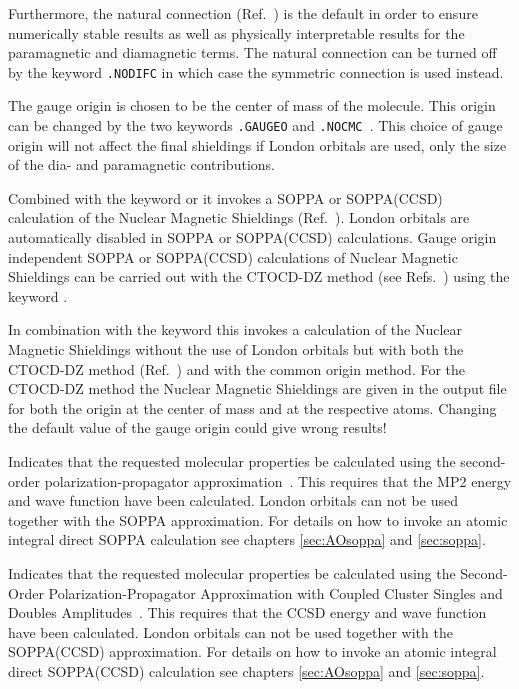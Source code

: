 \begin{description}
Furthermore, the natural connection
(Ref.~\cite{joklbkrthpjtca90,krthjopjklbcpl235}) is the default in order to ensure
numerically stable results as well as physically interpretable
results for the paramagnetic and diamagnetic terms. The natural
connection can be turned off by the keyword \verb|.NODIFC| in which
case the symmetric connection is used instead.


The gauge origin is chosen to be the center of
mass of the molecule.
This origin can be changed by the two keywords \verb|.GAUGEO| and
\verb|.NOCMC |. This choice of gauge origin will not affect
the final shieldings if London orbitals are used, only the size of the
dia- and paramagnetic contributions.

Combined with the keyword  or  it invokes a SOPPA
or SOPPA(CCSD) calculation of the Nuclear Magnetic Shieldings
(Ref.~\cite{paololazz1,paololazz2,ctocd}). London orbitals are automatically disabled in
SOPPA or SOPPA(CCSD)
calculations. Gauge origin independent SOPPA or SOPPA(CCSD) calculations of Nuclear
Magnetic Shieldings can be carried out with the CTOCD-DZ method
(see Refs.~\cite{paololazz1,paololazz2,ctocd}) using the keyword .

In combination with the keyword  this invokes a calculation of the
Nuclear Magnetic Shieldings without the use of London orbitals but with both
the CTOCD-DZ method (Ref.~\cite{paololazz1,paololazz2,ctocd}) and with the common
origin method. For the CTOCD-DZ method the Nuclear Magnetic Shieldings are given in
the output file for both the origin at the center of mass and at the respective atoms.
Changing the default value of the gauge origin could give wrong results!

\item[\Key{SOPPA}] Indicates that the requested molecular properties
be calculated using the second-order polarization-propagator
approximation~\cite{mjpekdtehjajjojcp}. This requires that
the MP2 energy and wave function have been calculated. London orbitals
can not be used together with the SOPPA approximation. For details on
how to invoke an atomic integral direct SOPPA calculation
\cite{spas037} see chapters \ref{sec:AOsoppa} and \ref{sec:soppa}.

\item[\Key{SOPPA(CCSD)}] Indicates that the requested molecular properties
be calculated using the Second-Order Polarization-Propagator
Approximation with Coupled Cluster Singles and Doubles
Amplitudes~\cite{soppaccsd,tejospastcan100,ekdspasjpca102,ctocd}.
This requires that the CCSD energy and wave function have been
calculated. London orbitals can not be used together with the
SOPPA(CCSD) approximation. For details on how to invoke an atomic
integral direct SOPPA(CCSD) calculation \cite{spas037, spas089} see
chapters \ref{sec:AOsoppa}
 and \ref{sec:soppa}.


\end{description}
